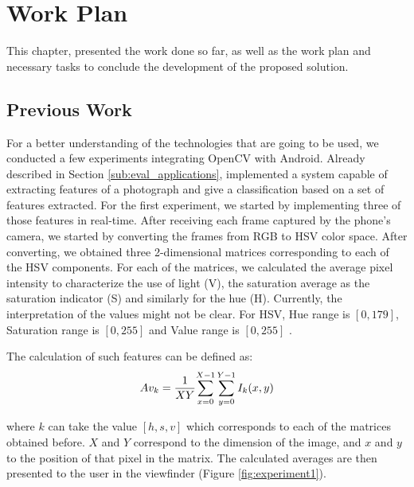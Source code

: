 \chapter{Work Plan}
\label{cha:work_plan}

This chapter, presented the work done so far, as well as the work plan and necessary tasks to conclude the development of the proposed solution.

\section{Previous Work}
\label{sub:previous_work}

For a better understanding of the technologies that are going to be used, we conducted a few experiments integrating OpenCV with Android.
Already described in Section \ref{sub:eval_applications}, \citeauthor{datta2006studying} \cite{datta2006studying} implemented a system capable of extracting features of a photograph and give a classification based on a set of features extracted.
For the first experiment, we started by implementing three of those features in real-time. After receiving each frame captured by the phone's camera, we started by converting the frames from RGB to HSV color space. After converting, we obtained three 2-dimensional matrices corresponding to each of the HSV components. For each of the matrices, we calculated the average pixel intensity to characterize the use of light (V), the saturation average as the saturation indicator (S) and similarly for the hue (H). Currently, the interpretation of the values might not be clear. For HSV, Hue range is $[0,179]$, Saturation range is $[0,255]$ and Value range is $[0,255]$ \cite{OCV}.

The calculation of such features can be defined as:
\begin{equation}
Av_{k} = {{1 \over XY} {\sum_{x=0}^{X-1}{\sum_{y=0}^{Y-1}{I_{k}(x,y)}}}}
\label{eq:average_hsv}
\end{equation}

where $k$ can take the value $[h,s,v]$ which corresponds to each of the matrices obtained before. $X$ and $Y$ correspond to the dimension of the image, and $x$ and $y$ to the position of that pixel in the matrix.
The calculated averages are then presented to the user in the viewfinder (Figure \ref{fig:experiment1}).


